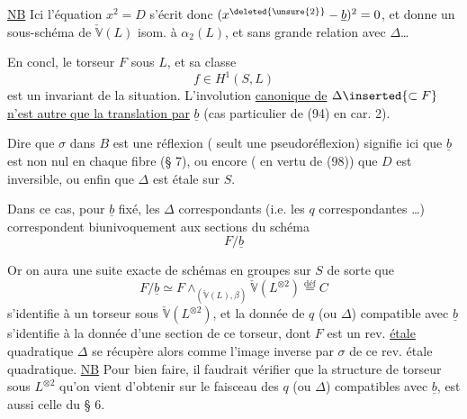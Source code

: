 \uline{NB} Ici l'équation $x^2=D$ s'écrit donc $(x^{\deleted{\unsure{2}}}-\underline b)^2=0$, et donne un sous-schéma de $\check{\mathbb V}(L)$ isom. à $\alpha_2(L)$, et sans grande relation avec $\Delta$\ldots

En concl,  le torseur $F$ sous $L$, et sa classe
\[f\in H^1(S,L)\tag*{(100)}\]
est un  invariant de la situation. L'involution
 \uline{canonique de} $\Delta\inserted{\subset F}$ \uline{n'est autre que la translation par} $\underline b$ (cas particulier de (94) en car. 2). 

Dire que $\sigma$ dans $B$ est une réflexion ( seult une pseudoréflexion) signifie ici que $\underline b$ est non nul en chaque fibre (§ 7), ou encore ( en vertu de (98)) que $D$ est   inversible, ou enfin que $\Delta$ est étale sur $S$.

Dans ce cas, pour $\underline b$ fixé, les $\Delta$ correspondants (i.e. les $q$ correspondantes \ldots) correspondent biunivoquement aux sections du schéma
\[F/\underline b\]

Or  on aura une suite exacte de schémas en groupes sur $S$
de sorte que
\[F/\underline b\simeq F\mathbin{\wedge}_{(\check{\mathbb V}(L),\beta)}\check{\mathbb V}(L^{\otimes2})\overset{\mathrm{déf}}=C\tag*{(102)}\]
s'identifie à un torseur  sous $\check{\mathbb V}(L^{\otimes2})$, et la donnée de $q$ (ou $\Delta$) compatible avec $\underline b$ s'identifie à la donnée d'une section \inserted{$\sigma$} de ce torseur, dont $F$ est un rev. \uline{étale} quadratique $\Delta$ se récupère alors comme l'image inverse par $\sigma$ de ce rev. étale quadratique.
\uline{NB} Pour bien faire, il faudrait vérifier que la structure de torseur sous $L^{\otimes2}$ qu'on vient d'obtenir sur le faisceau des $q$ (ou $\Delta$) compatibles avec $\underline b$, est aussi celle du § 6.

